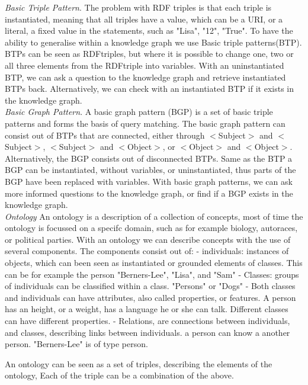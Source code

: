 \documentclass[11pt,letterpaper ,oneside ]{book}
\begin{document}
\textit{Basic Triple Pattern}. The problem with RDF triples is that each triple is instantiated, meaning that all triples have a value, which can be a URI, or a literal,  a fixed value in the statements, such as "Lisa", "12", "True". 
To have the ability to generalise within a knowledge graph we use Basic triple patterns(BTP). BTPs can be seen as RDFtriples, but where it is possible to change one, two or all three elements from the RDFtriple into variables. With an uninstantiated BTP, we can ask a question to the knowledge graph and retrieve instantiated BTPs back. Alternatively, we can check with an instantiated BTP if it exists in the knowledge graph.\\

\textit{Basic Graph Pattern}. A basic graph pattern (BGP) is a set of basic triple patterns and forms the basis of query matching. The basic graph pattern
can consist out of BTPs that are connected, either through $<$Subject$>$ and $<$Subject$>$, $<$Subject$>$ and $<$Object$>$, or $<$Object$>$ and $<$Object$>$.
Alternatively, the BGP consists out of disconnected BTPs. Same as the BTP a BGP can be instantiated, without variables, or uninstantiated, thus parts of the BGP have been replaced with variables. With basic graph patterns, we can ask more informed questions to the knowledge graph, or find if a BGP exists in the knowledge graph.\\

\textit{Ontology} An ontology is a description of a collection of concepts, most of time the ontology is focussed on a specifc domain, such as for example biology, autoraces, or political parties. With an ontology we can describe concepts with the use of several components. The components consist out of:
- individuals: instances of objects, which can been seen as instantiated or grounded elements of classes. This can be for example the person "Berners-Lee", "Lisa", and "Sam"
- Classes: groups of individuals can be classified within a class. "Persons" or "Dogs"
- Both classes and individuals can have attributes, also called properties, or features. A person has an height, or a weight, has a language he or she can talk. Different classes can have different properties. 
- Relations, are connections between individuals, and classes, describing links between individuals. a person can know a another person. "Berners-Lee" is of type person. 

An ontology can be seen as a set of triples, describing the elements of the ontology, Each of the triple can be a combination of the above.
\end{document}
